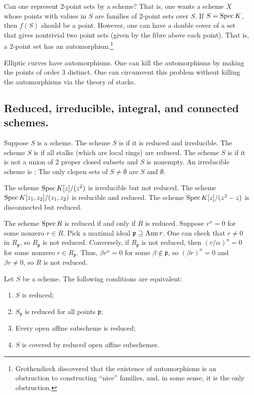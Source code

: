 \documentclass [11 pt, oneside] {article}
\begin{document}
Can one represent $2$-point sets by a scheme? That is, one wants a scheme $X$ whose points with values in $S$ are families of $2$-point sets over $S$. If $S=\operatorname{Spec} K$, then $f(S)$ should be a point. However, one can have a double cover of a set that gives nontrivial two point sets (given by the fibre above each point). That is, a $2$-point set has an automorphism.\footnote{Grothendieck discovered that the existence of automorphisms is an obstruction to constructing ``nice'' families, and, in some sense, it is the only obstruction.} 

Elliptic curves have automorphisms. One can kill the automorphisms by making the points of order $3$ distinct. One can circumvent this problem without killing the automorphisms via the theory of stacks.

\subsection{Reduced, irreducible, integral, and connected schemes.}
Suppose $S$ is a scheme. The scheme $S$ is  if it is reduced and irreducible. The scheme $S$ is  if all stalks (which are local rings) are reduced. The scheme $S$ is  if it is not a union of $2$ proper closed subsets and $S$ is nonempty. An irreducible scheme is : The only clopen sets of $S\ne \emptyset$ are $S$ and $\emptyset$.

\begin{example}[ ]\label{}\text{}
The scheme $\operatorname{Spec} K[z]/(z^2)$ is irreducible but not reduced. The scheme $\operatorname{Spec} K[z_1,z_2]/(z_1,z_2)$ is reducible and reduced. The scheme $\operatorname{Spec} K[z]/(z^2-z)$ is disconnected but reduced.
\end{example}

The scheme $\operatorname{Spec} R$ is reduced if and only if $R$ is reduced. Suppose $r^n =0$ for some nonzero $r\in R$. Pick a maximal ideal $\mathfrak{p}\supseteq \operatorname{Ann} r$. One can check that $r\ne 0$ in $R_{\mathfrak{p}}$, so $R_{\mathfrak{p}}$ is not reduced. Conversely, if $R_{\mathfrak{p}}$ is not reduced, then $(r/\alpha)^n=0$ for some nonzero $r\in R_{\mathfrak{p}}$. Thus, $\beta r^n =0$ for some $\beta\notin \mathfrak{p}$, so $(\beta r)^n=0$ and $\beta r\ne 0$, so $R$ is not reduced. 

\begin{proposition}[ ]\label{}\text{}
Let $S$ be a scheme. The following conditions are equivalent:
\begin{enumerate}
	\item $S$ is reduced;
	\item $S_{\mathfrak{p}}$ is reduced for all points $\mathfrak{p}$;
	\item Every open affine subscheme is reduced;
	\item $S$ is covered by reduced open affine subschemes.
\end{enumerate}
\end{proposition}
\end{document}

